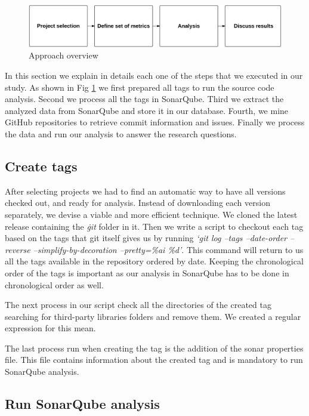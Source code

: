 \begin{figure}[!hbt]
    \caption{Approach overview}
    \centering
    \label{fig:approach_overview}
    \includegraphics[width=1\textwidth]{figures/approach_overview}
 \end{figure}


In this section we explain in details each one of the steps that we executed in our study. As shown in Fig \ref{fig:approach_overview} we first prepared all tags to run the source code analysis. Second we process all the tags in SonarQube. Third we extract the analyzed data from SonarQube and store it in our database. Fourth, we mine GitHub repositories to retrieve commit information and issues. Finally we process the data and run our analysis to answer the research questions.  
 
\subsection{Create tags}

After selecting projects we had to find an automatic way to have all versions checked out, and ready for analysis. Instead of downloading each version separately, we devise a viable and more efficient technique. We cloned the latest release containing the \textit{\.git} folder in it. Then we write a script to checkout each tag based on the tags that git itself gives us by running \textit{`git log --tags --date-order --reverse --simplify-by-decoration --pretty=\%ai \%d'}. This command will return to us all the tags available in the repository ordered by date. Keeping the chronological order of the tags is important as our analysis in SonarQube has to be done in chronological order as well. 

The next process in our script check all the directories of the created tag searching for third-party libraries folders and remove them. We created a regular expression for this mean. 

The last process run when creating the tag is the addition of the sonar properties file. This file contains information about the created tag and is mandatory to run SonarQube analysis.


\subsection{Run SonarQube analysis}

